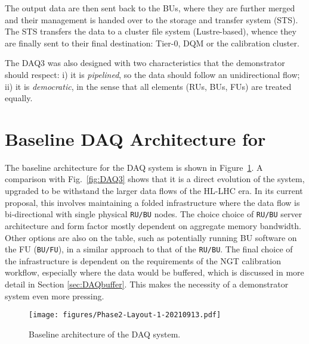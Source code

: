 The output data are then sent back to the BUs, where they are further merged and their management is handed over to the storage and transfer system (STS). The STS  transfers the data to a cluster file system (Lustre-based), whence they are finally sent to their final destination: Tier-0, DQM or the calibration cluster.

The DAQ3 was also designed with two characteristics that the demonstrator should respect: 
i) it is \emph{pipelined}, so the data should follow an unidirectional flow;
ii) it is \emph{democratic}, in the sense that all elements (RUs, BUs, FUs) are treated equally.

\section{Baseline DAQ Architecture for \Phasetwo}\label{sec:DAQP2}
The baseline architecture for  the \Phasetwo DAQ system is shown in Figure~\ref{fig:DAQP2}. A comparison with Fig.~\ref{fig:DAQ3} shows that it is a direct evolution of the \Runtwo system, upgraded to be withstand the larger data flows of the HL-LHC era. In its current proposal, this involves maintaining a folded infrastructure where the data flow is bi-directional with single physical \texttt{RU/BU} nodes. The choice choice of \texttt{RU/BU} server architecture and form factor mostly dependent on aggregate memory bandwidth. Other options are also on the table, such as potentially running BU software on the FU (\texttt{BU/FU}), in a similar approach to that of the \texttt{RU/BU}. The final choice of the infrastructure is dependent on the requirements of the NGT calibration workflow, especially where the data would be buffered, which is discussed in more detail in Section \ref{sec:DAQbuffer}. This makes the necessity of a demonstrator system even more pressing.

\begin{figure}[htbp]
   \centering
	\texttt{[image: figures/Phase2-Layout-1-20210913.pdf]}
  \caption{Baseline architecture of the \Phasetwo DAQ system.}
   \label{fig:DAQP2}
\end{figure}

